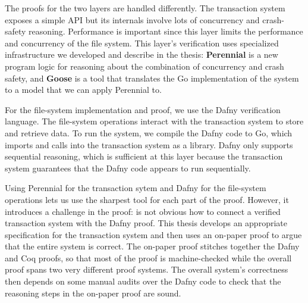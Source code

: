 The proofs for the two layers are handled differently. The transaction
system exposes a simple API but its internals involve lots of
concurrency and crash-safety reasoning. Performance is important since
this layer limits the performance and concurrency of the file system.
This layer's verification uses specialized infrastructure we developed
and describe in the thesis: \textbf{Perennial} is a new program logic
for reasoning about the combination of concurrency and crash safety, and
\textbf{Goose} is a tool that translates the Go implementation of the
system to a model that we can apply Perennial to.

For the file-system implementation and proof, we use the Dafny
verification language. The file-system operations interact with the
transaction system to store and retrieve data. To run the system, we
compile the Dafny code to Go, which imports and calls into the
transaction system as a library. Dafny only supports sequential
reasoning, which is sufficient at this layer because the transaction
system guarantees that the Dafny code appears to run sequentially.

Using Perennial for the transaction sytem and Dafny for the file-system
operations lets us use the sharpest tool for each part of the proof. However, it
introduces a challenge in the proof: is not obvious how to connect a verified
transaction system with the Dafny proof. This thesis develops an appropriate
specification for the transaction system and then uses an on-paper proof to
argue that the entire system is correct. The on-paper proof stitches together
the Dafny and Coq proofs, so that most of the proof is machine-checked while the
overall proof spans two very different proof systems. The overall system's
correctness then depends on some manual audits over the Dafny code to check that
the reasoning steps in the on-paper proof are sound.

